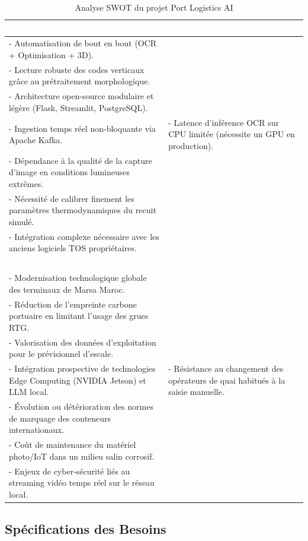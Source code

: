 \documentclass[12pt,a4paper]{article}
\begin{document}
\begin{table}[H]
\centering
\caption{Analyse SWOT du projet Port Logistics AI}
\begin{tabular}{|p{7cm}|p{7cm}|}
\hline
\rowcolor{TableHeader}\textcolor{white}{\textbf{Forces (Strengths)}} & \textcolor{white}{\textbf{Faiblesses (Weaknesses)}} \\ \hline
- Automatisation de bout en bout (OCR + Optimisation + 3D).\\
- Lecture robuste des codes verticaux grâce au prétraitement morphologique.\\
- Architecture open-source modulaire et légère (Flask, Streamlit, PostgreSQL).\\
- Ingestion temps réel non-bloquante via Apache Kafka. &
- Latence d'inférence OCR sur CPU limitée (nécessite un GPU en production).\\
- Dépendance à la qualité de la capture d'image en conditions lumineuses extrêmes.\\
- Nécessité de calibrer finement les paramètres thermodynamiques du recuit simulé.\\
- Intégration complexe nécessaire avec les anciens logiciels TOS propriétaires. \\ \hline
\rowcolor{TableHeader}\textcolor{white}{\textbf{Opportunités (Opportunities)}} & \textcolor{white}{\textbf{Menaces (Threats)}} \\ \hline
- Modernisation technologique globale des terminaux de Marsa Maroc.\\
- Réduction de l'empreinte carbone portuaire en limitant l'usage des grues RTG.\\
- Valorisation des données d'exploitation pour le prévisionnel d'escale.\\
- Intégration prospective de technologies Edge Computing (NVIDIA Jetson) et LLM local. &
- Résistance au changement des opérateurs de quai habitués à la saisie manuelle.\\
- Évolution ou détérioration des normes de marquage des conteneurs internationaux.\\
- Coût de maintenance du matériel photo/IoT dans un milieu salin corrosif.\\
- Enjeux de cyber-sécurité liés au streaming vidéo temps réel sur le réseau local. \\ \hline
\end{tabular}
\label{tab:swot}
\end{table}

\subsection{Spécifications des Besoins}
\end{document}
